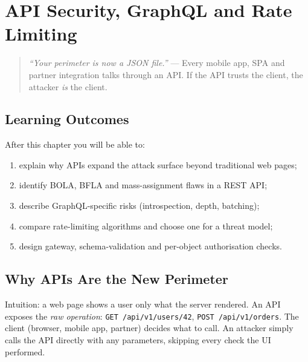 \chapter{API Security, GraphQL and Rate Limiting}
\label{ch:api}

\begin{quote}
\emph{``Your perimeter is now a JSON file.''} --- Every mobile app, SPA and partner integration talks through an API. If the API trusts the client, the attacker \emph{is} the client.
\end{quote}

\noindent{}
\vspace{0.4em}

\section*{Learning Outcomes}
After this chapter you will be able to:
\begin{enumerate}[label=(L\arabic*)]
    \item explain why APIs expand the attack surface beyond traditional web pages;
    \item identify BOLA, BFLA and mass-assignment flaws in a REST API;
    \item describe GraphQL-specific risks (introspection, depth, batching);
    \item compare rate-limiting algorithms and choose one for a threat model;
    \item design gateway, schema-validation and per-object authorisation checks.
\end{enumerate}

\section{Why APIs Are the New Perimeter}
\label{sec:api-why}
Intuition: a web page shows a user only what the server rendered. An API exposes the \emph{raw operation}: \texttt{GET /api/v1/users/42}, \texttt{POST /api/v1/orders}. The client (browser, mobile app, partner) decides what to call. An attacker simply calls the API directly with any parameters, skipping every check the UI performed.

